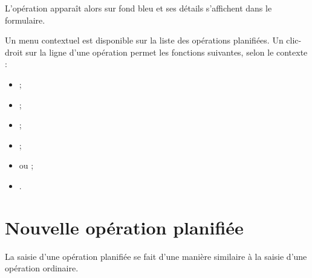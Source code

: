 L'opération apparaît alors sur fond bleu{\couleur} et ses détails s'affichent dans le formulaire.

Un menu contextuel est disponible sur la liste des opérations planifiées. Un clic-droit sur la ligne d'une opération permet les fonctions suivantes, selon le contexte :

\begin{itemize}
	\ifIllustration
	\label{planned-transactions-context-img}
	\fi
	 \item {} ;
	 \item {} ;
	 \item {} ;
	 \item {} ;
	 \item {} ou  ;	 
	 \item {}.
\end{itemize}

\ifIllustration
\fi


\section{Nouvelle opération planifiée\label{plannedtransactions-new}}


La saisie d'une opération planifiée se fait d'une manière similaire à la saisie d'une opération ordinaire.

